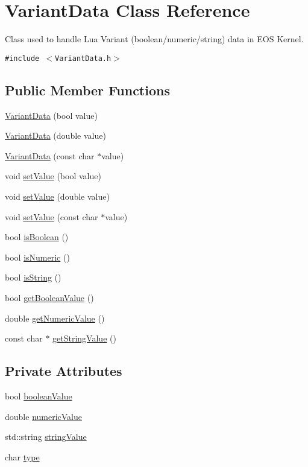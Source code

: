\hypertarget{classVariantData}{
\section{VariantData Class Reference}
\label{classVariantData}
}
Class used to handle Lua Variant (boolean/numeric/string) data in EOS Kernel.  


{\tt \#include $<$VariantData.h$>$}

\subsection*{Public Member Functions}
\begin{CompactItemize}
\item 
\hyperlink{classVariantData_90e5e3c8c2e17774418b3c5de03d24c4}{VariantData} (bool value)
\item 
\hyperlink{classVariantData_1eccb0ef55abb0849460e289364fa8a1}{VariantData} (double value)
\item 
\hyperlink{classVariantData_033f281690c41ecb8529d5ec4dcee50f}{VariantData} (const char $\ast$value)
\item 
void \hyperlink{classVariantData_d4ee952cc8ced49176df1d773dec64dd}{setValue} (bool value)
\item 
void \hyperlink{classVariantData_4bb158230df201cbba62f3274bf67bf2}{setValue} (double value)
\item 
void \hyperlink{classVariantData_85c6fb4d9c36148288216e2fcc6a34b4}{setValue} (const char $\ast$value)
\item 
bool \hyperlink{classVariantData_7f93c9a6ba029700231cb457b96408b1}{isBoolean} ()
\item 
bool \hyperlink{classVariantData_f521379b31650cd5fb8f35fd029967f7}{isNumeric} ()
\item 
bool \hyperlink{classVariantData_add04c5ac48a44ad1c26ab6bf2099f4b}{isString} ()
\item 
bool \hyperlink{classVariantData_d6438333334172e261c0a76c8bbc325d}{getBooleanValue} ()
\item 
double \hyperlink{classVariantData_8ff14068dcf97d44f0cb73fe36fb90be}{getNumericValue} ()
\item 
const char $\ast$ \hyperlink{classVariantData_bbf9e6d4a64cf875d3d16a51d2e9fb2f}{getStringValue} ()
\end{CompactItemize}
\subsection*{Private Attributes}
\begin{CompactItemize}
\item 
bool \hyperlink{classVariantData_b89d01eddb1623a19a762816f8ecbe1b}{booleanValue}
\item 
double \hyperlink{classVariantData_2c126081da9af039f2a928eb1d0431c9}{numericValue}
\item 
std::string \hyperlink{classVariantData_b6149a1e20119b6ba877f7c6b43551e9}{stringValue}
\item 
char \hyperlink{classVariantData_c93d42bf9dd34df412312f2c29767aad}{type}
\end{CompactItemize}


